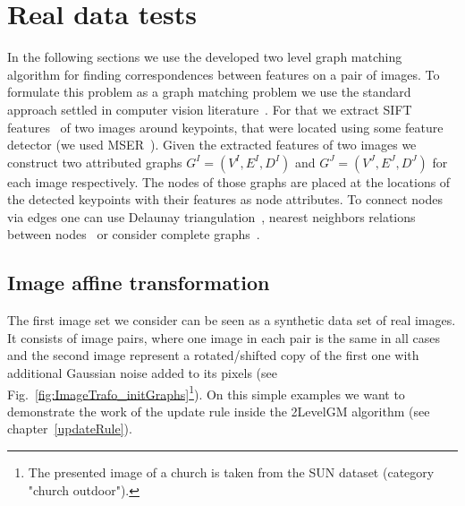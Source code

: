 \section{Real data tests}
In the following sections we use the developed two level graph matching algorithm for finding correspondences between features on a pair of images. To formulate this problem as a graph matching problem we use the standard approach settled in computer vision literature~\cite{Cho2010_RRWM,Cho2012_ProgressiveGM,FastPFP,Hancock_EM_SVD,Hancock_GM_SpectralPart}. For that we extract SIFT features~\cite{Lowe2004} of two images around keypoints, that were located using some feature detector (we used  MSER~\cite{MSER}). Given the extracted features of two images we construct two attributed graphs $G^I=(V^I,E^I,D^I)$ and $G^J=(V^J,E^J,D^J)$ for each image respectively. The nodes of those graphs are placed at the locations of the detected keypoints with their features as node attributes. To connect nodes via edges one can use Delaunay triangulation~\cite{Hancock_EM_SVD,Hancock_GM_SpectralPart}, nearest neighbors relations between nodes~\cite{Sanrom2012} or consider complete graphs~\cite{Cho2012_ProgressiveGM,Cho2014_Haystack}.

\subsection{Image affine transformation}
The first image set we consider can be seen as a synthetic data set of real images. It consists of image pairs, where one image in each pair is the same in all cases and the second image represent a rotated/shifted copy of the first one with additional Gaussian noise added to its pixels (see Fig.~\ref{fig:ImageTrafo_initGraphs}\footnote{The presented image of a church is taken from the SUN\cite{SUN} dataset (category "church outdoor").}). On this simple examples we want to demonstrate the work of the update rule inside the 2LevelGM algorithm (see chapter~\ref{updateRule}).

